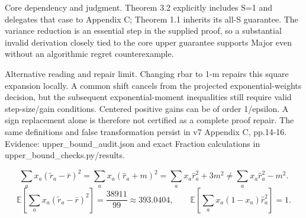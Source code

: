 \documentclass[10pt]{article}
\begin{document}
Core dependency and judgment. Theorem 3.2 explicitly includes S=1 and delegates that case to Appendix C; Theorem 1.1 inherits its all-S guarantee. The variance reduction is an essential step in the supplied proof, so a substantial invalid derivation closely tied to the core upper guarantee supports Major even without an algorithmic regret counterexample.\par
Alternative reading and repair limit. Changing rbar to 1-m repairs this square expansion locally. A common shift cancels from the projected exponential-weights decision, but the subsequent exponential-moment inequalities still require valid step-size/gain conditions. Centered positive gains can be of order 1/epsilon. A sign replacement alone is therefore not certified as a complete proof repair. The same definitions and false transformation persist in v7 Appendix C, pp.14-16. Evidence: upper\_bound\_audit.json and exact Fraction calculations in upper\_bound\_checks.py/results.\par
\[\sum_a x_a(\widetilde r_a-\bar r)^2=\sum_a x_a(\widehat r_a+m)^2=\sum_a x_a\widehat r_a^2+3m^2\ne\sum_a x_a\widehat r_a^2-m^2.\] \[\mathbb E\!\left[\sum_a x_a(\widetilde r_a-\bar r)^2\right]=\frac{38911}{99}\approx393.0404,\qquad \mathbb E\!\left[\sum_a x_a(1-x_a)\widehat r_a^2\right]=1.\]\par
\end{document}
